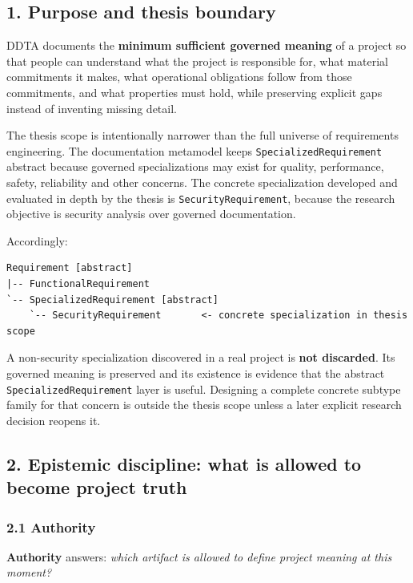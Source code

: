 \documentclass[11pt,a4paper]{article}
\begin{document}
\subsection{1. Purpose and thesis
boundary}\label{1-purpose-and-thesis-boundary}

DDTA documents the \textbf{minimum sufficient governed meaning} of a
project so that people can understand what the project is responsible
for, what material commitments it makes, what operational obligations
follow from those commitments, and what properties must hold, while
preserving explicit gaps instead of inventing missing detail.

The thesis scope is intentionally narrower than the full universe of
requirements engineering. The documentation metamodel keeps
\texttt{SpecializedRequirement} abstract because governed
specializations may exist for quality, performance, safety, reliability
and other concerns. The concrete specialization developed and evaluated
in depth by the thesis is \texttt{SecurityRequirement}, because the
research objective is security analysis over governed documentation.

Accordingly:

\begin{verbatim}
Requirement [abstract]
|-- FunctionalRequirement
`-- SpecializedRequirement [abstract]
    `-- SecurityRequirement       <- concrete specialization in thesis scope
\end{verbatim}

A non-security specialization discovered in a real project is
\textbf{not discarded}. Its governed meaning is preserved and its
existence is evidence that the abstract \texttt{SpecializedRequirement}
layer is useful. Designing a complete concrete subtype family for that
concern is outside the thesis scope unless a later explicit research
decision reopens it.

\subsection{2. Epistemic discipline: what is allowed to become project
truth}\label{2-epistemic-discipline-what-is-allowed-to-become-project-truth}

\subsubsection{2.1 Authority}\label{21-authority}

\textbf{Authority} answers: \emph{which artifact is allowed to define
project meaning at this moment?}
\end{document}
